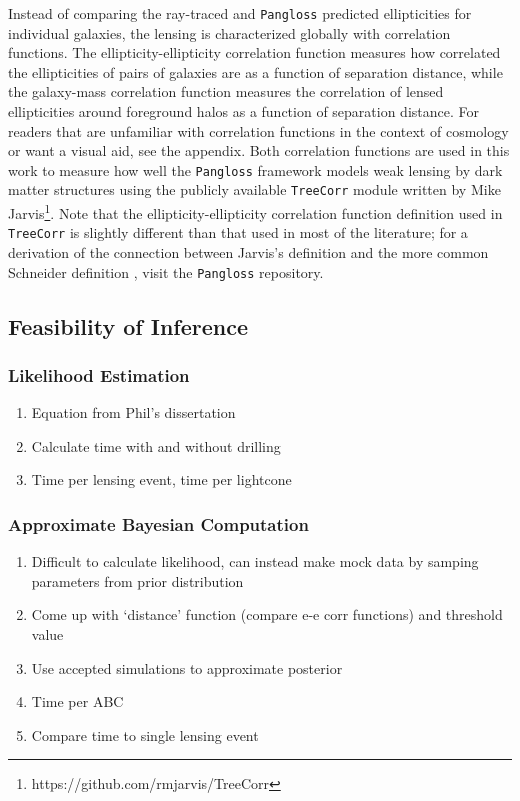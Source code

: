 \documentclass[%
 reprint,
 amsmath,amssymb,
 aps,nofootinbib
]{revtex4-1}
\begin{document}
Instead of comparing the ray-traced and \texttt{Pangloss} predicted
ellipticities for individual galaxies, the lensing is characterized
globally with correlation functions. The ellipticity-ellipticity
correlation function measures how correlated the ellipticities of pairs
of galaxies are as a function of separation distance, while the
galaxy-mass correlation function measures the correlation of lensed
ellipticities around foreground halos as a function of separation
distance. For readers that are unfamiliar with correlation functions in
the context of cosmology or want a visual aid, see the appendix. Both
correlation functions are used in this work to measure how well the
\texttt{Pangloss} framework models weak lensing by dark matter
structures using the publicly available \texttt{TreeCorr} module written
by Mike Jarvis\footnote{https://github.com/rmjarvis/TreeCorr}. Note that
the ellipticity-ellipticity correlation function definition used in
\texttt{TreeCorr} is slightly different than that used in most of the
literature; for a derivation of the connection between Jarvis's
definition and the more common Schneider definition \cite{schneider},
visit the \texttt{Pangloss} repository\footnotemark[\ref{note1}].

\subsection*{Feasibility of Inference}

\subsubsection*{Likelihood Estimation}
\begin{enumerate}
\item Equation from Phil's dissertation
\item Calculate time with and without drilling
\item Time per lensing event, time per lightcone
\end{enumerate}

\subsubsection*{Approximate Bayesian Computation}
\begin{enumerate}
\item Difficult to calculate likelihood, can instead make mock data by samping parameters from prior distribution
\item Come up with `distance' function (compare e-e corr functions) and threshold value
\item Use accepted simulations to approximate posterior
\item Time per ABC
\item Compare time to single lensing event
\end{enumerate}
\end{document}
